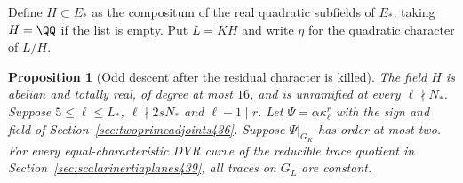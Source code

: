 \documentclass[a4paper,11pt]{article}
\newtheorem{proposition}{Proposition}[section]
\theoremstyle{definition}
\theoremstyle{remark}
\numberwithin{equation}{section}
\begin{document}
Define \(H\subset E_*\) as the compositum of the real quadratic
subfields of \(E_*\), taking \(H=\QQ\) if the list is empty.
Put \(L=KH\) and write \(\eta\) for the quadratic character of
\(L/H\).

\begin{proposition}[Odd descent after the residual character is killed]\leavevmode
\label{prop:evenfieldplane442}
The field \(H\) is abelian and totally real, of degree at most
\(16\), and is unramified at every \(\ell\nmid N_*\).
Suppose \(5\le\ell\le L_*\), \(\ell\nmid 2sN_*\) and
\(\ell-1\mid r\). Let \(\Psi=\alpha\kappa_\ell^r\) with the sign
and field of Section~\ref{sec:twoprimeadjoints436}.
Suppose \(\bar\Psi|_{G_K}\) has order at most two. For every
equal-characteristic DVR curve of the reducible trace quotient
in Section~\ref{sec:scalarinertiaplanes439}, all traces on
\(G_L\) are constant.
\end{proposition}
\end{document}
